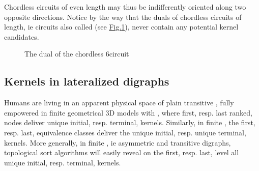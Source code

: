 \documentclass[a4paper,10pt,english]{sphinxhowto}
\let\sphinxpxdimen\pdfpxdimen\else\newdimen\sphinxpxdimen
\begin{document}
Chordless circuits of even length may thus be indifferently oriented along two opposite directions. Notice by the way that the duals of  chordless circuits of    length, ie  circuits also called  (see \hyperref[\detokenize{tutorial:dualchordlesscircuit}]{Fig.\@ \ref{\detokenize{tutorial:dualchordlesscircuit}}}), never contain any potential kernel candidates.

\begin{sphinxVerbatim}[commandchars=\\\{\},numbers=left,firstnumber=1,stepnumber=1]
\end{sphinxVerbatim}

\begin{figure}[htbp]
\centering
\capstart

\noindent\sphinxincludegraphics[width=350\sphinxpxdimen]{{dualChordlessCircuit}.png}
\caption{The dual of the chordless 6\sphinxhyphen{}circuit}\label{\detokenize{tutorial:dualchordlesscircuit}}\end{figure}


\subsection{Kernels in lateralized digraphs}
\label{\detokenize{tutorial:kernels-in-lateralized-digraphs}}
Humans are living in an apparent physical space of plain transitive , fully empowered in finite geometrical 3D models with , where first, resp. last ranked, nodes deliver unique initial, resp. terminal, kernels. Similarly, in finite , the first, resp. last, equivalence classes deliver the unique initial, resp. unique terminal, kernels. More generally, in finite , ie asymmetric and transitive digraphs, topological sort algorithms will easily reveal on the first, resp. last, level all unique initial, resp. terminal, kernels.
\end{document}
